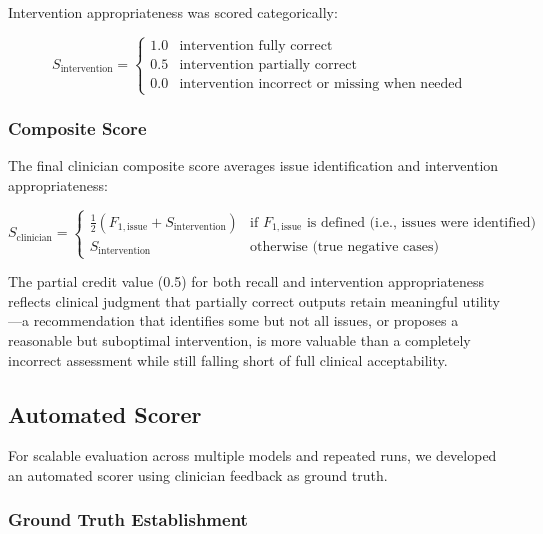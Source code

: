 Intervention appropriateness was scored categorically:

\begin{equation}
    S_{\text{intervention}} = \begin{cases}
        1.0 & \text{intervention fully correct} \\
        0.5 & \text{intervention partially correct} \\
        0.0 & \text{intervention incorrect or missing when needed}
    \end{cases}
\end{equation}

\subsubsection{Composite Score}

The final clinician composite score averages issue identification and intervention appropriateness:

\begin{equation}
    S_{\text{clinician}} = \begin{cases}
        \frac{1}{2}(F_{1,\text{issue}} + S_{\text{intervention}}) & \text{if } F_{1,\text{issue}} \text{ is defined (i.e., issues were identified)} \\[0.5em]
        S_{\text{intervention}} & \text{otherwise (true negative cases)}
    \end{cases}
\end{equation}

The partial credit value (0.5) for both recall and intervention appropriateness reflects clinical judgment that partially correct outputs retain meaningful utility---a recommendation that identifies some but not all issues, or proposes a reasonable but suboptimal intervention, is more valuable than a completely incorrect assessment while still falling short of full clinical acceptability.

\subsection{Automated Scorer}
\label{sec:scoring-automated}

For scalable evaluation across multiple models and repeated runs, we developed an automated scorer using clinician feedback as ground truth.

\subsubsection{Ground Truth Establishment}

